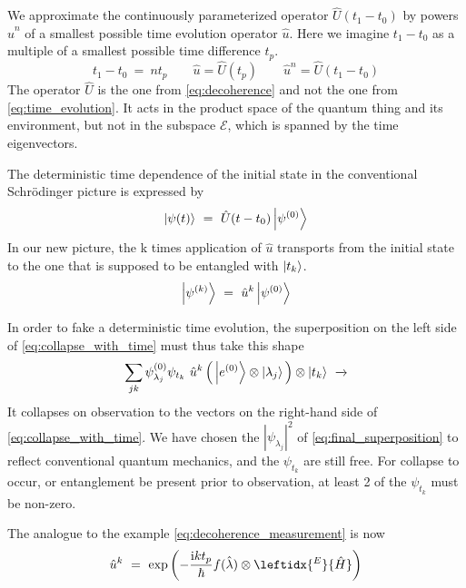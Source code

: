 \documentclass[12pt]{article}
\begin{document}
We approximate the continuously parameterized operator $\hat{U}(t_1-t_0)$ by powers $\hat{u}^n$ of a smallest possible time evolution operator $\hat{u}$. Here we imagine $t_1-t_0$ as a multiple of a smallest possible time difference $t_p$.\begin{equation*}
t_1-t_0\ =\ n t_p \quad\quad 
\hat{u} = \hat{U}(t_p) \quad\quad 
\hat{u}^n = \hat{U}(t_1-t_0)
\end{equation*}
The operator $\hat{U}$ is the one from \eqref{eq:decoherence} and not the one from \eqref{eq:time_evolution}. It acts in the product space of the quantum thing and its environment, but not in the subspace $\mathscr{E}$, which is spanned by the time eigenvectors.

The deterministic time dependence of the initial state in the conventional Schrödinger picture is expressed by
\begin{equation*}
\ket{\psi(t)}\ =\ \hat{U}(t-t_0)\ket{\psi^{(0)}}
\end{equation*} 
In our new picture, the k times application of $\hat{u}$ transports from the initial state to the one that is supposed to be entangled with $\ket{t_k}$.
\begin{equation*}
\ket{\psi^{(k)}}\ =\ \hat{u}^k \ket{\psi^{(0)}}
\end{equation*} 

In order to fake a deterministic time evolution, the superposition on the left side of \eqref{eq:collapse_with_time} must thus take this shape
\begin{equation}
\label{eq:final_superposition}
\sum_{jk} \psi_{\lambda_j}^{(0)}\psi_{t_k}\ \hat{u}^{k} \left(\,\ket{e^{(0)}} \otimes \ket{\lambda_j} \,\right) \otimes \ket{t_k}
\ \xrightarrow{}
\end{equation}
It collapses on observation to the vectors on the right-hand side of \eqref{eq:collapse_with_time}. We have chosen the $|\psi_{\lambda_j}|^2$ of \eqref{eq:final_superposition} to reflect conventional quantum mechanics, and the $\psi_{t_k}$ are still free. For collapse to occur, or entanglement be present prior to observation, at least 2 of the $\psi_{t_k}$ must be non-zero. 

The analogue to the example \eqref{eq:decoherence_measurement} is now
\begin{equation}
\label{eq:decoherence_measurement_new}
\hat{u}^k\ =\ \mathrm{exp}\left(-\frac{\mathrm{i}k t_p}{\hbar}f(\hat{\lambda})\otimes \leftidx{^E}{\hat{H}}\right)
\end{equation}
\end{document}
